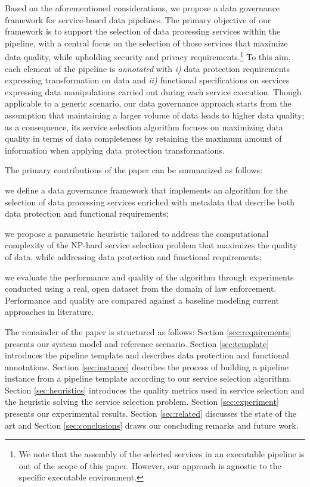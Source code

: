 Based on the aforementioned considerations, we propose a data governance framework for {\color{OurColor}service-based data pipelines}.
The primary objective of our framework is to support the selection of data processing services within the pipeline, with a central focus on the selection of those services that {\color{OurColor}maximize} data quality, while upholding security and privacy requirements.\footnote{{\color{OurColor}We note that the assembly of the selected services in an executable pipeline is out of the scope of this paper. However, our approach is agnostic to the specific executable environment.}}
To this aim, each element of the pipeline is \textit{annotated} with \emph{i)} data protection requirements expressing transformation on data and \emph{ii)} functional specifications on services expressing data manipulations carried out during each service execution.
Though applicable to a generic scenario, our data governance approach starts from the assumption that maintaining a larger volume of data leads to higher data quality; as a consequence, its service selection algorithm focuses on maximizing data quality {\color{OurColor}in terms of data completeness} by retaining the maximum amount of information when applying data protection transformations.

The primary contributions of the paper can be summarized as follows:
\begin{enumerate*}
  \item we define a data governance framework {\color{OurColor}that implements an algorithm for the selection of data processing services} enriched with metadata that describe both data protection and functional requirements;
  \item we propose a parametric heuristic tailored to address the computational complexity of the NP-hard service selection problem {\color{OurColor}that maximizes the quality of data, while addressing data protection and functional requirements};
  \item we evaluate the performance and quality of the algorithm through experiments conducted using {\color{OurColor}a real, open dataset from the domain of law enforcement. Performance and quality are compared against a baseline modeling current approaches in literature.}
\end{enumerate*}

The remainder of the paper is structured as follows: Section \ref{sec:requirements} presents our system model and reference scenario. Section \ref{sec:template} introduces the pipeline template and describes data protection and functional annotations. Section \ref{sec:instance} describes the process of building a pipeline instance from a pipeline template according to our service selection algorithm. Section \ref{sec:heuristics} introduces the quality metrics used in service selection and the heuristic solving the service selection problem. Section \ref{sec:experiment} presents our experimental results. Section \ref{sec:related} discusses the state of the art and Section \ref{sec:conclusions} draws our concluding remarks and future work.